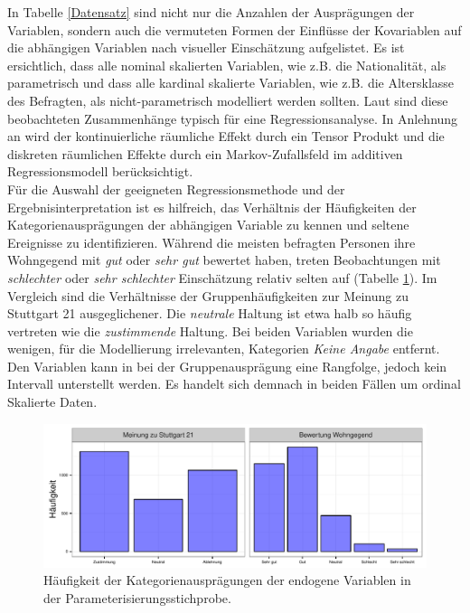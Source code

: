 \documentclass{Vorlage}
\begin{document}
In Tabelle \ref{Datensatz} sind nicht nur die Anzahlen der Ausprägungen der Variablen, sondern auch die vermuteten 
Formen der Einflüsse der Kovariablen auf die abhängigen Variablen nach visueller Einschätzung aufgelistet. Es ist 
ersichtlich, dass alle nominal skalierten Variablen, wie z.B. die Nationalität, als parametrisch und dass 
alle kardinal skalierte Variablen, wie z.B. die Altersklasse des Befragten, als nicht-parametrisch 
modelliert werden sollten. Laut \cite[p.9]{fahrmeir2009regression} sind diese beobachteten Zusammenhänge typisch für 
eine Regressionsanalyse. In Anlehnung an \cite[p. 503 ff. \& p. 524 ff.]{fahrmeir2013regression} wird der 
kontinuierliche räumliche Effekt durch ein Tensor Produkt und die diskreten räumlichen Effekte durch ein Markov-Zufallsfeld im additiven Regressionsmodell berücksichtigt.\\
Für die Auswahl der geeigneten Regressionsmethode und der Ergebnisinterpretation ist es hilfreich, das Verhältnis der 
Häufigkeiten der Kategorienausprägungen der abhängigen Variable zu kennen und seltene Ereignisse zu identifizieren. 
Während die meisten befragten Personen ihre Wohngegend mit \textit{gut} oder \textit{sehr gut} bewertet haben, treten 
Beobachtungen mit \textit{schlechter} oder \textit{sehr schlechter} Einschätzung relativ selten auf (Tabelle 
\ref{endogene}). Im Vergleich sind die Verhältnisse der Gruppenhäufigkeiten zur Meinung zu Stuttgart 21 
ausgeglichener. Die \textit{neutrale} Haltung ist etwa halb so häufig vertreten wie die \textit{zustimmende} Haltung. 
Bei beiden Variablen wurden die wenigen, für die Modellierung irrelevanten, Kategorien 
\textit{Keine Angabe} entfernt. Den Variablen kann in bei der Gruppenausprägung eine Rangfolge, jedoch kein 
Intervall unterstellt werden. Es handelt sich demnach in beiden Fällen um ordinal Skalierte Daten.

\begin{figure}[h]
 \begin{center}
 \includegraphics[scale=0.8]{Pictures/BarResp}
 \caption{Häufigkeit der Kategorienausprägungen der endogene Variablen in der Parameterisierungsstichprobe.}
 \label{endogene}
 \end{center}
\end{figure}
\end{document}

